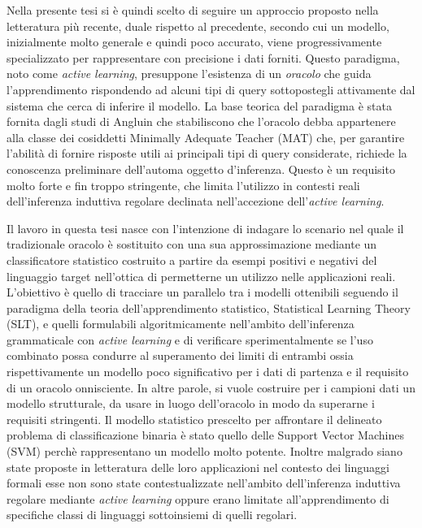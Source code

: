 Nella presente tesi si è quindi scelto di seguire un approccio proposto nella letteratura più recente, duale rispetto al precedente, secondo cui un modello, inizialmente molto generale e quindi poco accurato, viene progressivamente specializzato per rappresentare con precisione i dati forniti. Questo paradigma, noto come \textit{active learning}, presuppone l'esistenza di un \textit{oracolo} che guida l'apprendimento rispondendo ad alcuni tipi di query sottopostegli attivamente dal sistema che cerca di inferire il modello. La base teorica del paradigma è stata fornita dagli studi di Angluin \cite{Angluin87} che stabiliscono che l'oracolo debba appartenere alla classe dei cosiddetti Minimally Adequate Teacher (MAT) che, per garantire l'abilità di fornire risposte utili ai principali tipi di query considerate, richiede la conoscenza preliminare dell'automa oggetto d'inferenza.
Questo è un requisito molto forte e fin troppo stringente, che limita l'utilizzo in contesti reali dell'inferenza induttiva regolare declinata nell'accezione dell'\textit{active learning}.

Il lavoro in questa tesi nasce con l'intenzione di indagare lo scenario nel quale il tradizionale oracolo è sostituito con una sua approssimazione mediante un classificatore statistico costruito a partire da esempi positivi e negativi del linguaggio target nell'ottica di permetterne un utilizzo nelle applicazioni reali. L'obiettivo è quello di tracciare un parallelo tra i modelli ottenibili seguendo il paradigma della teoria dell'apprendimento statistico, Statistical Learning Theory (SLT), e quelli formulabili algoritmicamente nell'ambito dell'inferenza grammaticale con \textit{active learning} e di verificare sperimentalmente se l'uso combinato possa condurre al superamento dei limiti di entrambi ossia rispettivamente un modello poco significativo per i dati di partenza e il requisito di un oracolo onnisciente. In altre parole, si vuole costruire per i campioni dati un modello strutturale, da usare in luogo dell'oracolo in modo da superarne i requisiti stringenti.  Il modello statistico prescelto per affrontare il delineato problema di classificazione binaria è stato quello delle Support Vector Machines (SVM) perchè rappresentano un modello molto potente. Inoltre malgrado siano state proposte in letteratura delle loro applicazioni nel contesto dei linguaggi formali esse non sono state contestualizzate nell’ambito dell’inferenza induttiva regolare mediante \textit{active learning} oppure erano limitate all'apprendimento di specifiche classi di linguaggi sottoinsiemi di quelli regolari.

